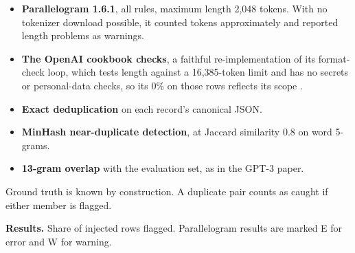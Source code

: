 \begin{itemize}
\tightlist
\item
  \textbf{Parallelogram 1.6.1}, all rules, maximum length 2,048 tokens. With no tokenizer download possible, it counted tokens approximately and reported length problems as warnings.
\item
  \textbf{The OpenAI cookbook checks}, a faithful re-implementation of its format-check loop, which tests length against a 16,385-token limit and has no secrets or personal-data checks, so its 0\% on those rows reflects its scope \citep{openai2026cookbook}.
\item
  \textbf{Exact deduplication} on each record's canonical JSON.
\item
  \textbf{MinHash near-duplicate detection}, at Jaccard similarity 0.8 on word 5-grams.
\item
  \textbf{13-gram overlap} with the evaluation set, as in the GPT-3 paper.
\end{itemize}

Ground truth is known by construction. A duplicate pair counts as caught if either member is flagged.

\textbf{Results. } Share of injected rows flagged. Parallelogram results are marked E for error and W for warning.

